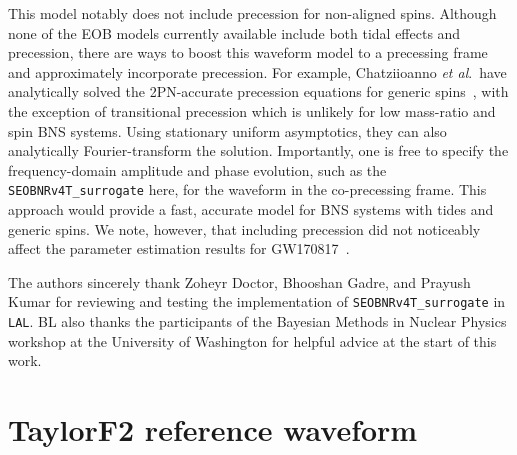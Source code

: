 \documentclass[prd,aps,letter,twocolumn,floatfix,notitlepage,nofootinbib]{revtex4-1}
\begin{document}
This model notably does not include precession for non-aligned spins. Although none of the EOB models currently available include both tidal effects and precession, there are ways to boost this waveform model to a precessing frame and approximately incorporate precession. For example, Chatziioanno {\it et al}.\ have analytically solved the 2PN-accurate precession equations for generic spins~\cite{ChatziioannouKleinCornish2017a, ChatziioannouKleinCornish2017b}, with the exception of transitional precession which is unlikely for low mass-ratio and spin BNS systems. Using stationary uniform asymptotics, they can also analytically Fourier-transform the solution. Importantly, one is free to specify the frequency-domain amplitude and phase evolution, such as the \texttt{SEOBNRv4T\_surrogate} here, for the waveform in the co-precessing frame. This approach would provide a fast, accurate model for BNS systems with tides and generic spins. We note, however, that including precession did not noticeably affect the parameter estimation results for GW170817~\cite{BNSPE}.


\begin{acknowledgments}

The authors sincerely thank Zoheyr Doctor, Bhooshan Gadre, and Prayush Kumar for reviewing and testing the implementation of \texttt{SEOBNRv4T\_surrogate} in \texttt{LAL}. BL also thanks the participants of the Bayesian Methods in Nuclear Physics workshop at the University of Washington for helpful advice at the start of this work.

\end{acknowledgments}

\appendix
\section{TaylorF2 reference waveform}
\label{sec:taylorf2}
\end{document}
